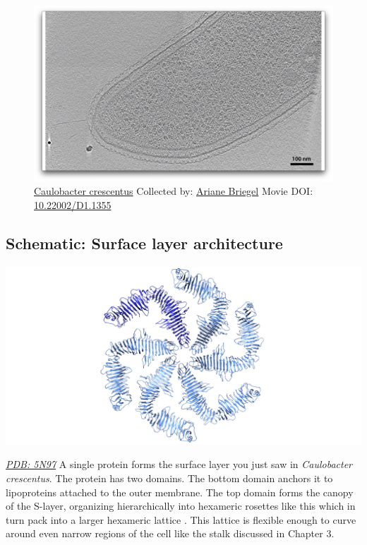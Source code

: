 \documentclass[]{tufte-book}
\begin{document}
\begin{figure}
\includegraphics{movie_stills/2_6} \caption[\protect\hyperlink{tree}{Caulobacter crescentus} Collected by:
\protect\hyperlink{ariane_briegel}{Ariane Briegel} Movie DOI:
\href{https://doi.org/10.22002/D1.1355}{10.22002/D1.1355}]{\protect\hyperlink{tree}{Caulobacter crescentus} Collected by:
\protect\hyperlink{ariane_briegel}{Ariane Briegel} Movie DOI:
\href{https://doi.org/10.22002/D1.1355}{10.22002/D1.1355}}\label{fig:2-6}
\end{figure}

\hypertarget{Surface_layer_architecture}{\subsection*{Schematic: Surface
layer architecture}\label{Surface_layer_architecture}}

\includegraphics{img/schematics/2_6_1}

\href{http://rcsb.org/structure/5N97}{\emph{PDB: 5N97}} A single protein
forms the surface layer you just saw in \emph{Caulobacter crescentus}.
The protein has two domains. The bottom domain anchors it to
lipoproteins attached to the outer membrane. The top domain forms the
canopy of the S-layer, organizing hierarchically into hexameric rosettes
like this which in turn pack into a larger hexameric lattice
\citep{bharat2017}. This lattice is flexible enough to curve around even
narrow regions of the cell like the stalk discussed in Chapter 3.
\end{document}
